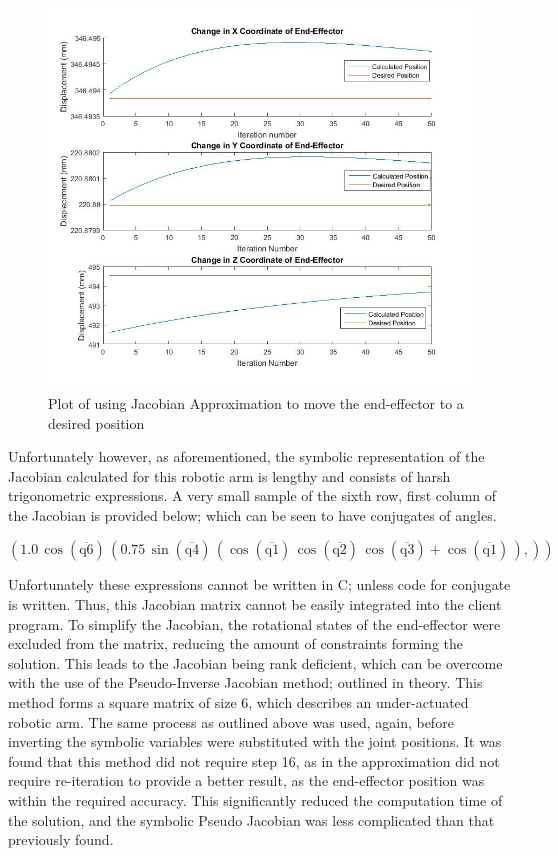 \documentclass[12pt,openany,a4paper]{book}
\begin{document}
\begin{center}
\begin{figure}[htb]
  \includegraphics[width=1\linewidth]{jacobian_plot.jpg}
\caption{Plot of using Jacobian Approximation to move the end-effector to a desired position }
\end{figure}
\end{center}

Unfortunately however, as aforementioned, the symbolic representation of the Jacobian calculated for this robotic arm is lengthy and consists of harsh trigonometric expressions. A very small sample of the sixth row, first column of the Jacobian is provided below; which can be seen to have conjugates of angles.

$\left(1.0\, \cos\!\left(\overline{\mathrm{q6}}\right)\, \left(0.75\, \sin\!\left(\overline{\mathrm{q4}}\right)\, \left(\cos\!\left(\overline{\mathrm{q1}}\right)\, \cos\!\left(\overline{\mathrm{q2}}\right)\, \cos\!\left(\overline{\mathrm{q3}}\right) + \cos\!\left(\overline{\mathrm{q1}}\right)\, \right),\right)\right)$
 
Unfortunately these expressions cannot be written in C; unless code for conjugate is written. Thus, this Jacobian matrix cannot be easily integrated into the client program. To simplify the Jacobian, the rotational states of the end-effector were excluded from the matrix, reducing the amount of constraints forming the solution. This leads to the Jacobian being rank deficient, which can be overcome with the use of the Pseudo-Inverse Jacobian method; outlined in theory. This method forms a square matrix of size 6, which describes an under-actuated robotic arm. The same process as outlined above was used, again, before inverting the symbolic variables were substituted with the joint positions. It was found that this method did not require step 16, as in the approximation did not require re-iteration to provide a better result, as the end-effector position was within the required accuracy. This significantly reduced the computation time of the solution, and the symbolic Pseudo Jacobian was less complicated than that previously found.
\end{document}
